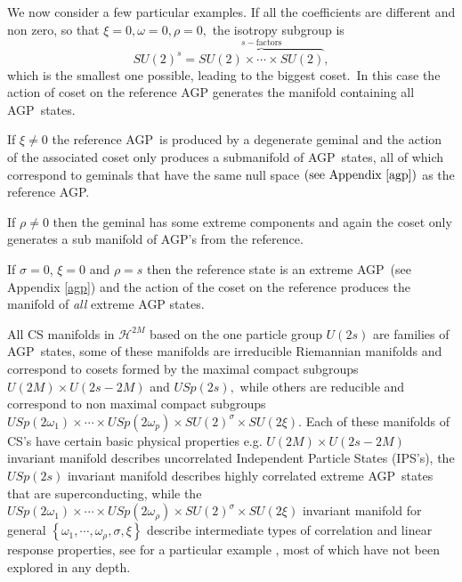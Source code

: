 \documentclass[12pt,aps,amsfonts,amssymb,tightenlines]{revtex4}%
\begin{document}
We now consider a few particular examples. If all the coefficients are
different and non zero, so that $\xi=0,\omega=0,\rho=0,$ the isotropy subgroup
is
\begin{equation}
SU\left(  2\right)  ^{s}=\overset{s-\text{factors}}{\overbrace{SU\left(
2\right)  \times\cdots\times SU\left(  2\right)  }},
\end{equation}
which is the smallest one possible, leading to the biggest coset.\ In this
case the action of coset on the reference AGP generates the manifold
containing all AGP\ states.

If $\xi\neq0$ the reference AGP\ is produced by a degenerate geminal and the
action of the associated coset only produces a submanifold of AGP\ states, all
of which correspond to geminals that have the same null space $\left(
\text{see Appendix \ref{agp}}\right)  $ as the reference AGP.

If $\rho\neq0$ then the geminal has some extreme components and again the
coset only generates a sub manifold of AGP's from the reference.

If $\sigma=0$, $\xi=0$ and $\rho=s$ then the reference state is an extreme
AGP\ (see Appendix \ref{agp}) and the action of the coset on the reference
produces the manifold of \emph{all }extreme AGP states.

All CS manifolds in $\mathcal{H}^{2M}$ based on the one particle group
$U\left(  2s\right)  $ are families of AGP\ states, some of these manifolds
are irreducible Riemannian manifolds and correspond to cosets formed by the
maximal compact subgroups $U\left(  2M\right)  \times U\left(  2s-2M\right)  $
and $USp\left(  2s\right)  ,$ while others are reducible and correspond to non
maximal compact subgroups $USp\left(  2\omega_{1}\right)  \times\cdots\times
USp\left(  2\omega_{p}\right)  \times SU\left(  2\right)  ^{\sigma}\times
SU\left(  2\xi\right)  $. Each of these manifolds of CS's have certain basic
physical properties e.g. $U\left(  2M\right)  \times U\left(  2s-2M\right)  $
invariant manifold describes uncorrelated Independent Particle States (IPS's),
the $USp\left(  2s\right)  $ invariant manifold describes highly correlated
extreme AGP\ states that are superconducting, while the $USp\left(
2\omega_{1}\right)  \times\cdots\times USp\left(  2\omega_{\rho}\right)
\times SU\left(  2\right)  ^{\sigma}\times SU\left(  2\xi\right)  $ invariant
manifold for general $\left\{  \omega_{1},\cdots,\omega_{\rho},\sigma
,\xi\right\}  $ describe intermediate types of correlation and linear response
properties, see for a particular example \cite{Goscinski82a}, most of which
have not been explored in any depth.
\end{document}
